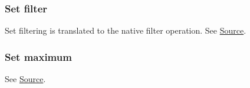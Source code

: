\subsubsection{Set filter}


\begin{mathpar}
\end{mathpar}

Set filtering is translated to the \tlap{} native filter operation.  See
\href{https://github.com/saltiniroberto/ssf/blob/7ea6e18093d9da3154b4e396dd435549f687e6b9/high_level/common/pythonic_code_generic.py#L63-L70}{Source}.

\subsubsection{ Set maximum}


\begin{mathpar}
\end{mathpar}

See
\href{https://github.com/saltiniroberto/ssf/blob/7ea6e18093d9da3154b4e396dd435549f687e6b9/high_level/common/pythonic_code_generic.py#L74-L76}{Source}.


